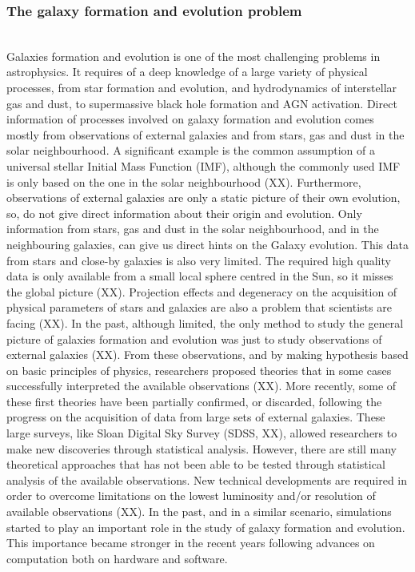 \documentclass[oneside, a4paper, onecolumn, 11pt]{article}
\begin{document}
\subsubsection*{The galaxy formation and evolution problem}\\
Galaxies formation and evolution is one of the most challenging problems in astrophysics. It requires of a deep knowledge of a large variety of physical processes, from star formation and evolution, and hydrodynamics of interstellar gas and dust, to supermassive black hole formation and AGN activation. Direct information of processes involved on galaxy formation and evolution comes mostly from observations of external galaxies and from stars, gas and dust in the solar neighbourhood. A significant example is the common assumption of a universal stellar Initial Mass Function (IMF), although the commonly used IMF is only based on the one in the solar neighbourhood (XX). Furthermore, observations of external galaxies are only a static picture of their own evolution, so, do not give direct information about their origin and evolution. Only information from stars, gas and dust in the solar neighbourhood, and in the neighbouring galaxies, can give us direct hints on the Galaxy evolution. This data from stars and close-by galaxies is also very limited. The required high quality data is only available from a small local sphere centred in the Sun, so it misses the global picture (XX). Projection effects and degeneracy on the acquisition of physical parameters of stars and galaxies are also a problem that scientists are facing (XX). In the past, although limited, the only method to study the general picture of galaxies formation and evolution was just to study observations of external galaxies (XX). From these observations, and by making hypothesis based on basic principles of physics, researchers proposed theories that in some cases successfully interpreted the available observations (XX). More recently, some of these first theories have been partially confirmed, or discarded, following the progress on the acquisition of data from large sets of external galaxies. These large surveys, like Sloan Digital Sky Survey (SDSS, XX), allowed researchers to make new discoveries through statistical analysis. However, there are still many theoretical approaches that has not been able to be tested through statistical analysis of the available observations. New technical developments are required in order to overcome limitations on the lowest luminosity and/or resolution of available observations (XX). In the past, and in a similar scenario, simulations started to play an important role in the study of galaxy formation and evolution. This importance became stronger in the recent years following advances on computation both on hardware and software.\\
\end{document}
